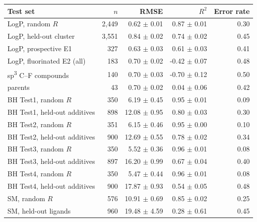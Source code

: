 \begin{tabular}{@{}lrrrr@{}}
\toprule
Test set & $n$ & RMSE & $R^2$ & Error rate \\
\midrule
LogP, random $R$ & 2,449 & 0.62 $\pm$ 0.01 & 0.87 $\pm$ 0.01 & 0.30 \\
LogP, held-out cluster & 3,551 & 0.84 $\pm$ 0.02 & 0.74 $\pm$ 0.02 & 0.45 \\
LogP, prospective E1 & 327 & 0.63 $\pm$ 0.03 & 0.61 $\pm$ 0.03 & 0.41 \\
LogP, fluorinated E2 (all) & 183 & 0.70 $\pm$ 0.02 & -0.42 $\pm$ 0.07 & 0.48 \\
\quad sp\textsuperscript{3} C--F compounds & 140 & 0.70 $\pm$ 0.03 & -0.70 $\pm$ 0.12 & 0.50 \\
\quad parents & 43 & 0.70 $\pm$ 0.02 & 0.04 $\pm$ 0.06 & 0.42 \\
\addlinespace
BH Test1, random $R$ & 350 & 6.19 $\pm$ 0.45 & 0.95 $\pm$ 0.01 & 0.09 \\
BH Test1, held-out additives & 898 & 12.08 $\pm$ 0.95 & 0.80 $\pm$ 0.03 & 0.30 \\
BH Test2, random $R$ & 351 & 6.15 $\pm$ 0.46 & 0.95 $\pm$ 0.00 & 0.10 \\
BH Test2, held-out additives & 900 & 12.69 $\pm$ 0.55 & 0.78 $\pm$ 0.02 & 0.34 \\
BH Test3, random $R$ & 350 & 5.52 $\pm$ 0.36 & 0.96 $\pm$ 0.01 & 0.08 \\
BH Test3, held-out additives & 897 & 16.20 $\pm$ 0.99 & 0.67 $\pm$ 0.04 & 0.40 \\
BH Test4, random $R$ & 350 & 5.47 $\pm$ 0.44 & 0.96 $\pm$ 0.01 & 0.08 \\
BH Test4, held-out additives & 900 & 17.87 $\pm$ 0.93 & 0.54 $\pm$ 0.05 & 0.48 \\
\addlinespace
SM, random $R$ & 576 & 10.91 $\pm$ 0.69 & 0.85 $\pm$ 0.02 & 0.25 \\
SM, held-out ligands & 960 & 19.48 $\pm$ 4.59 & 0.28 $\pm$ 0.61 & 0.45 \\
\bottomrule
\end{tabular}